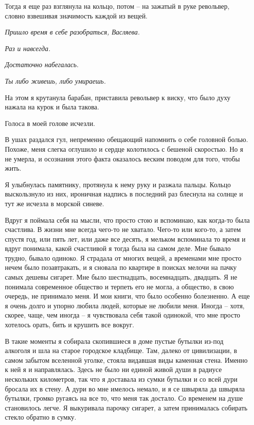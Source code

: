 \documentclass[
]{book}
\begin{document}
Тогда я еще раз взглянула на кольцо, потом -- на зажатый в руке револьвер, словно взвешивая значимость каждой из вещей.

\emph{Пришло время в себе разобраться, Васляева.}

\emph{Раз и навсегда.}

\emph{Достаточно набегалась.}

\emph{Ты либо живешь, либо умираешь.}

На этом я крутанула барабан, приставила револьвер к виску, что было духу нажала на курок и была такова.

Голоса в моей голове исчезли.

В ушах раздался гул, непременно обещающий напомнить о себе головной болью. Похоже, меня слегка оглушило и сердце колотилось с бешеной скоростью. Но я не умерла, и осознания этого факта оказалось веским поводом для того, чтобы жить.

Я улыбнулась памятнику, протянула к нему руку и разжала пальцы. Кольцо выскользнуло из них, ироничная надпись в последний раз блеснула на солнце и тут же исчезла в морской синеве.

Вдруг я поймала себя на мысли, что просто стою и вспоминаю, как когда-то была счастлива. В жизни мне всегда чего-то не хватало. Чего-то или кого-то, а затем спустя год, или пять лет, или даже все десять, я мельком вспоминала то время и вдруг понимала, какой счастливой я тогда была на самом деле. Мне бывало трудно, бывало одиноко. Я страдала от многих вещей, а временами мне просто нечем было позавтракать, и я сновала по квартире в поисках мелочи на пачку самых дешевы сигарет. Мне было шестнадцать, восемнадцать, двадцать. Я не понимала современное общество и терпеть его не могла, а общество, в свою очередь, не принимало меня. И мои книги, что было особенно болезненно. А еще я очень долго и упорно любила людей, которые не любили меня. Иногда -- хотя, скорее, чаще, чем иногда -- я чувствовала себя такой одинокой, что мне просто хотелось орать, бить и крушить все вокруг.

В такие моменты я собирала скопившиеся в доме пустые бутылки из-под алкоголя и шла на старое городское кладбище. Там, далеко от цивилизации, в самом забытом вселенной уголке, стояла видавшая виды каменная стена. Именно к ней я и направлялась. Здесь не было ни единой живой души в радиусе нескольких километров, так что я доставала из сумки бутылки и со всей дури бросала их в стену. А дури во мне имелось немало, и я се швыряла да швыряла бутылки, громко ругаясь на все то, что меня так достало. Со временем на душе становилось легче. Я выкуривала парочку сигарет, а затем принималась собирать стекло обратно в сумку.
\end{document}
